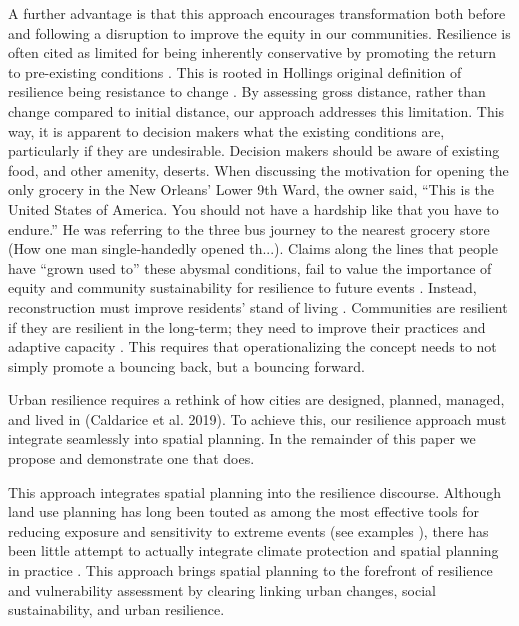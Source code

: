 \documentclass[9pt,twocolumn,twoside,lineno]{pnas-new}
\begin{document}
A further advantage is that this approach encourages transformation both before and following a disruption to improve the equity in our communities. Resilience is often cited as limited for being inherently conservative by promoting the return to pre-existing conditions \cite{Normandin2019-hp, I_Sudmeier-Rieux2014-lc, MacKinnon2013-nx}. This is rooted in Hollings original definition of resilience being resistance to change \cite{Holling1973-wb}. By assessing gross distance, rather than change compared to initial distance, our approach addresses this limitation. This way, it is apparent to decision makers what the existing conditions are, particularly if they are undesirable. Decision makers should be aware of existing food, and other amenity, deserts. When discussing the motivation for opening the only grocery in the New Orleans’ Lower 9th Ward, the owner said, “This is the United States of America. You should not have a hardship like that you have to endure.” He was referring to the three bus journey to the nearest grocery store (How one man single-handedly opened th...). Claims along the lines that people have “grown used to” these abysmal conditions, fail to value the importance of equity and community sustainability for resilience to future events \cite{Dempsey2011-og, Pantelic1991-qu}. Instead, reconstruction must improve residents’ stand of living \cite{Pantelic1991-qu}. Communities are resilient if they are resilient in the long-term; they need to improve their practices and adaptive capacity \cite{Saunders2015-uz}. This requires that operationalizing the concept needs to not simply promote a bouncing back, but a bouncing forward.


Urban resilience requires a rethink of how cities are designed, planned, managed, and lived in (Caldarice et al. 2019). To achieve this, our resilience approach must integrate seamlessly into spatial planning. In the remainder of this paper we propose and demonstrate one that does.


This approach integrates spatial planning into the resilience discourse. Although land use planning has long been touted as among the most effective tools for reducing exposure and sensitivity to extreme events \cite{Brunetta2019-ki, Campbell2006-in, Hurlimann2012-uj} (see examples \cite{Logan2018-xj, Anderson2018-hr}), there has been little attempt to actually integrate climate protection and spatial planning in practice \cite{Barnes2017-xf}. This approach brings spatial planning to the forefront of resilience and vulnerability assessment by clearing linking urban changes, social sustainability, and urban resilience.
\end{document}
